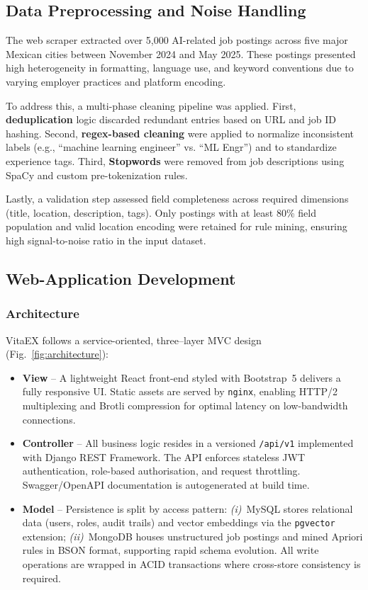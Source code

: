 \documentclass[runningheads]{llncs}
\begin{document}
\subsection{Data Preprocessing and Noise Handling}

The web scraper extracted over 5,000 AI-related job postings across five major Mexican cities between November 2024 and May 2025. These postings presented high heterogeneity in formatting, language use, and keyword conventions due to varying employer practices and platform encoding.

To address this, a multi-phase cleaning pipeline was applied. First, \textbf{deduplication} logic discarded redundant entries based on URL and job ID hashing. Second, \textbf{regex-based cleaning} were applied to normalize inconsistent labels (e.g., ``machine learning engineer'' vs. ``ML Engr'') and to standardize experience tags. Third, \textbf{Stopwords} were removed from job descriptions using SpaCy and custom pre-tokenization rules.

Lastly, a validation step assessed field completeness across required dimensions (title, location, description, tags). Only postings with at least 80\% field population and valid location encoding were retained for rule mining, ensuring high signal-to-noise ratio in the input dataset.


\subsection{Web-Application Development}
\label{ssec:web_dev}

\subsubsection{Architecture}
VitaEX follows a service-oriented, three–layer MVC design (Fig.~\ref{fig:architecture}):
\begin{itemize}[leftmargin=*]
	\item \textbf{View} – A lightweight React front-end styled with Bootstrap~5 delivers a fully
	responsive UI.  Static assets are served by \texttt{nginx}, enabling HTTP/2
	multiplexing and Brotli compression for optimal latency on low-bandwidth connections.
	\item \textbf{Controller} – All business logic resides in a versioned \texttt{/api/v1}
	implemented with Django REST Framework.  The API enforces stateless JWT
	authentication, role-based authorisation, and request throttling.  Swagger/OpenAPI
	documentation is autogenerated at build time.
	\item \textbf{Model} – Persistence is split by access pattern:  
	\emph{(i)}~MySQL stores relational data (users, roles, audit trails) and vector
	embeddings via the \texttt{pgvector} extension;  
	\emph{(ii)}~MongoDB houses unstructured job postings and mined Apriori rules in BSON
	format, supporting rapid schema evolution.  
	All write operations are wrapped in ACID transactions where cross-store consistency
	is required.
\end{itemize}
\end{document}

